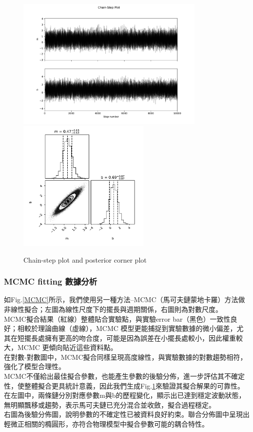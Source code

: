 \documentclass[12pt,a4paper]{article}
\begin{document}
\begin{CJK}{UTF8}{bkai}
\clearpage

\begin{figure}[h]
    \centering
    \includegraphics[height=6.5cm]{chain.pdf}
    \includegraphics[height=6.5cm]{corner.pdf}
    \caption{Chain-step plot and posterior corner plot}
    \label{fig:IDK}
\end{figure}

\subsubsection{MCMC fitting 數據分析}
\hfill

\indent 如Fig.\ref{MCMC}所示，我們使用另一種方法--MCMC（馬可夫鏈蒙地卡羅）方法做非線性擬合；左圖為線性尺度下的擺長與週期關係，右圖則為對數尺度。\\
\indent MCMC擬合結果（紅線）整體貼合實驗點，與實驗error bar（黑色）一致性良好；相較於理論曲線（虛線），MCMC 模型更能捕捉到實驗數據的微小偏差，尤其在短擺長處擁有更高的吻合度，可能是因為誤差在小擺長處較小，因此權重較大，MCMC 更傾向貼近這些資料點。\\
\indent 在對數-對數圖中，MCMC擬合同樣呈現高度線性，與實驗數據的對數趨勢相符，強化了模型合理性。\\
\indent MCMC不僅給出最佳擬合參數，也能產生參數的後驗分佈，進一步評估其不確定性，使整體擬合更具統計意義，因此我們生成Fig.\ref{fig:IDK}來驗證其擬合解果的可靠性。\\
\indent 在左圖中，兩條鏈分別對應參數m與b的歷程變化，顯示出已達到穩定波動狀態，無明顯飄移或趨勢，表示馬可夫鏈已充分混合並收斂，擬合過程穩定。\\
\indent 右圖為後驗分佈圖，說明參數的不確定性已被資料良好約束。聯合分佈圖中呈現出輕微正相關的橢圓形，亦符合物理模型中擬合參數可能的耦合特性。


\end{CJK}
\end{document}
